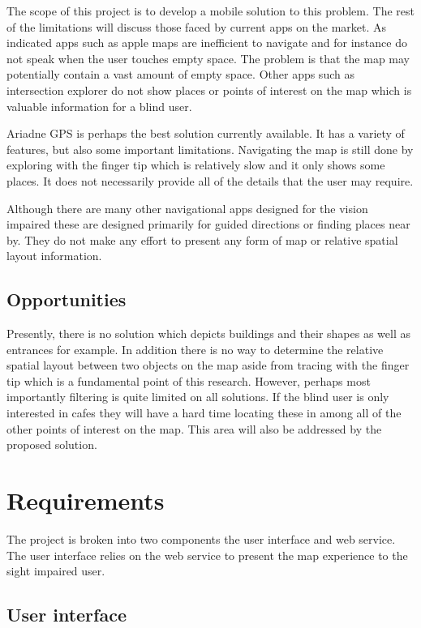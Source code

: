 \documentclass[11pt,twoside,a4paper]{article}
\begin{document}
The scope of this project is to develop a mobile solution to this
problem. The rest of the limitations will discuss those faced by current
apps on the market. As indicated apps such as apple maps are inefficient
to navigate and for instance do not speak when the user touches empty
space. The problem is that the map may potentially contain a vast amount
of empty space. Other apps such as intersection explorer do not show
places or points of interest on the map which is valuable information
for a blind user. 

Ariadne GPS is perhaps the best solution currently available. It has a
variety of features, but also some important limitations. Navigating the
map is still done by exploring with the finger tip which is relatively
slow and it only shows some places. It does not necessarily provide all
of the details that the user may require.

Although there are many other navigational apps designed for the vision
impaired these are designed primarily for guided directions or finding
places near by. They do not make any effort to present any form of map
or relative spatial layout information.

\subsection{Opportunities}
Presently, there is no solution which depicts buildings and their shapes
as well as entrances for example. In addition there is no way to
determine the relative spatial layout between two objects on the map
aside from tracing with the finger tip which is a fundamental point of
this research. However, perhaps most importantly filtering is quite
limited on all solutions. If the blind user is only interested in cafes
they will have a hard time locating these in among all of the other
points of interest on the map. This area will also be addressed by the
proposed solution.

\section{Requirements}

The project is broken into two components the user interface and web
service. The user interface relies on the web service to present the map
experience to the sight impaired user.

\subsection{User interface}
\end{document}
